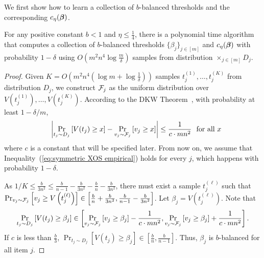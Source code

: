 We first show how to learn a collection of $b$-balanced thresholds and the corresponding $c_\eta(\boldsymbol{\beta})$.
\begin{lemma}\label{lem:symmetric XOS learn beta and c}
	For any positive constant $b<1$ and $\eta\leq \frac{1}{4}$, there is a polynomial time algorithm that computes a collection of $b$-balanced thresholds $\{\beta_j\}_{j\in[m]}$ and $c_\eta(\boldsymbol{\beta})$ with probability $1-\delta$ using $O\left(m^2 n^4 \log \frac{m}{\delta}\right)$ samples from distribution $\times_{j\in[m]} D_j$.
\end{lemma}
 	\begin{proof}
 		Given $K=O\left(m^2n^4\left(\log m+\log \frac{1}{\delta}\right)\right)$ samples $t_j^{(1)},\ldots, t_j^{(K)}$ from distribution $D_j$, we construct ${\mathcal{F}}_j$ as the uniform distribution over $V\left(t_j^{(1)}\right),\ldots,V\left(t_j^{(K)}\right)$. According to the DKW Theorem~\cite{DvoretzkyKW56}, with probability at least $1-\delta/m$, 
 		\begin{equation}\label{eq:symmetric XOS empirical}
 			\quad \left|\Pr_{t_{j}\sim D_j}\left[V(t_j)\geq x\right]-\Pr_{v_j\sim {\mathcal{F}}_j}\left[v_j\geq x\right]\right|\leq \frac{1}{c\cdot mn^2}~~\text{for all $x$} 	
 		\end{equation}
 where $c$ is a constant that will be specified later. From now on, we assume that Inequality~(\ref{eq:symmetric XOS empirical}) holds for every $j$, which happens with probability $1-\delta$. 
 
As %
$1/K\leq \frac{b}{3n^2}\leq \frac{b}{n-1}-\frac{b}{3n^2}- \frac{b}{n}-\frac{b}{3n^2}$, there must exist a sample $t_j^{(\ell)}$ such that $\Pr_{v_j\sim {\mathcal{F}}_j}\left[v_j\geq V\left(t_j^{(\ell)}\right)\right]\in \left[\frac{b}{n}+\frac{b}{3n^2}, \frac{b}{n-1}-\frac{b}{3n^2}\right]$. Let $\beta_j=V\left(t_j^{(\ell)}\right)$. 
Note that $$\Pr_{t_{j}\sim D_j}\left[V(t_j)\geq \beta_j\right]\in \left[\Pr_{v_j\sim {\mathcal{F}}_j}\left[v_j\geq \beta_j \right]-\frac{1}{c\cdot mn^2}, \Pr_{v_j\sim {\mathcal{F}}_j}\left[v_j\geq \beta_j\right]+\frac{1}{c\cdot mn^2}\right].$$ 
If $c$ is less than $\frac{b}{3}$, $\Pr_{t_{j}\sim D_j}\left[V(t_j)\geq \beta_j\right]\in\left[\frac{b}{n}, \frac{b}{n-1}\right]$. Thus, $\beta_j$ is $b$-balanced  for all item $j$.%
 		

\end{proof}
